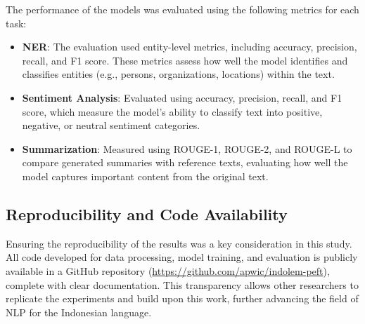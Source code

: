 The performance of the models was evaluated using the following metrics for each task:

\begin{itemize}
    \item \textbf{NER}: The evaluation used entity-level metrics, including accuracy, precision, recall, and F1 score. These metrics assess how well the model identifies and classifies entities (e.g., persons, organizations, locations) within the text.
    \item \textbf{Sentiment Analysis}: Evaluated using accuracy, precision, recall, and F1 score, which measure the model's ability to classify text into positive, negative, or neutral sentiment categories.
    \item \textbf{Summarization}: Measured using ROUGE-1, ROUGE-2, and ROUGE-L to compare generated summaries with reference texts, evaluating how well the model captures important content from the original text.
\end{itemize}

\subsection{Reproducibility and Code Availability}

Ensuring the reproducibility of the results was a key consideration in this study. All code developed for data processing, model training, and evaluation is publicly available in a GitHub repository (\url{https://github.com/apwic/indolem-peft}), complete with clear documentation. This transparency allows other researchers to replicate the experiments and build upon this work, further advancing the field of NLP for the Indonesian language.

